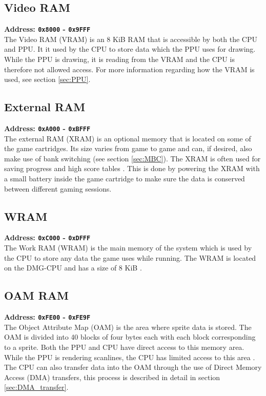 \subsection{Video RAM}
\textbf{Address: \texttt{0x8000} - \texttt{0x9FFF}}
\\
The Video RAM (VRAM) is an 8 KiB RAM \cite{pandocsmemorymap} that is accessible by both the CPU and PPU. 
It it used by the CPU to store data which the PPU uses for drawing. 
While the PPU is drawing, it is reading from the VRAM and the CPU is therefore not allowed access. 
For more information regarding how the VRAM is used, see section \ref{sec:PPU}.


\subsection{External RAM}
\textbf{Address: \texttt{0xA000} - \texttt{0xBFFF}}
\\
The external RAM (XRAM) is an optional memory that is located on some of the game cartridges. Its size varies from game to game and can, if desired, also make use of bank switching (see section \ref{sec:MBC}). The XRAM is often used for saving progress and high score tables \cite{pandocsmemorymap}. This is done by powering the XRAM with a small battery inside the game cartridge to make sure the data is conserved between different gaming sessions. 

\subsection{WRAM}
\textbf{Address: \texttt{0xC000} - \texttt{0xDFFF}}
\\
The Work RAM (WRAM) is the main memory of the system which is used by the CPU to store any data the game uses while running. The WRAM is located on the DMG-CPU and has a size of 8 KiB \cite{pandocsmemorymap}.


\subsection{OAM RAM}
\textbf{Address: \texttt{0xFE00} - \texttt{0xFE9F}}
\\
The Object Attribute Map (OAM) is the area where sprite data is stored. The OAM is divided into 40 blocks of four bytes each with each block corresponding to a sprite. Both the PPU and CPU have direct access to this memory area. While the PPU is rendering scanlines, the CPU has limited access to this area \cite{pandocsoam}. The CPU can also transfer data into the OAM through the use of Direct Memory Access (DMA) transfers, this process is described in detail in section \ref{sec:DMA_transfer}.

